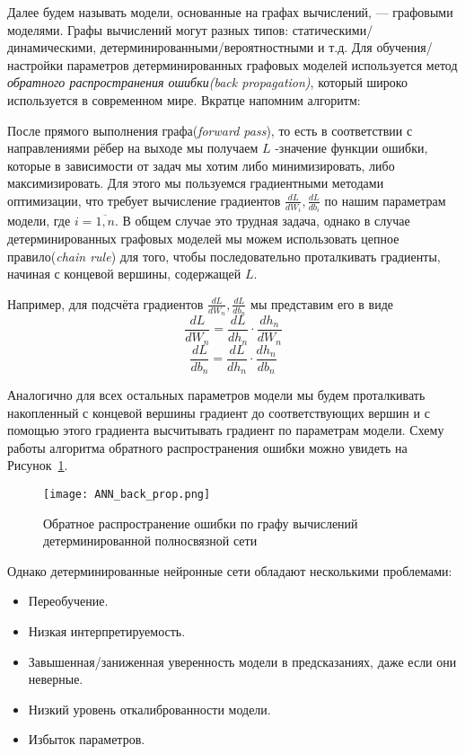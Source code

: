Далее будем называть модели, основанные на графах вычислений, --- графовыми моделями. Графы вычислений могут разных типов:
 статическими/динамическими, детерминированными/вероятностными и т.д. Для обучения/настройки параметров детерминированных графовых моделей
 используется метод \textit{обратного распространения ошибки(back propagation)}, который широко используется в современном мире. Вкратце напомним алгоритм:

После прямого выполнения графа(\textit{forward pass}), то есть в соответствии с направлениями рёбер на выходе мы получаем
 $L$ -значение функции ошибки, которые в зависимости от задач мы хотим либо минимизировать, либо максимизировать. Для этого
 мы пользуемся градиентными методами оптимизации, что требует вычисление градиентов $\frac{dL}{d W_i}, \frac{dL}{d b_i}$ по нашим параметрам модели, где $i = \overline{1,n}$.
 В общем случае это трудная задача, однако в случае детерминированных графовых моделей мы можем использовать цепное правило(\textit{chain rule}) для того, чтобы последовательно
 проталкивать градиенты, начиная с концевой вершины, содержащей $L$.

 Например, для подсчёта градиентов $\frac{dL}{d W_n}, \frac{dL}{d b_n}$ мы представим его в виде
 $$\frac{dL}{d W_n} = \frac{dL}{d h_n} \cdot \frac{d h_n}{d W_n}$$
 $$\frac{dL}{d b_n} = \frac{dL}{d h_n} \cdot \frac{d h_n}{d b_n}$$

Аналогично для всех остальных параметров модели мы будем проталкивать накопленный с концевой вершины градиент до соответствующих вершин и
 с помощью этого градиента высчитывать градиент по параметрам модели. Схему работы алгоритма обратного распространения ошибки
 можно увидеть на Рисунок~\ref{fig:ANN_back_prop}.
\begin{figure}[H]
    \centering
    \texttt{[image: ANN\_back\_prop.png]}
    \caption{Обратное распространение ошибки по графу вычислений детерминированной полносвязной сети}
    \label{fig:ANN_back_prop}
\end{figure}

Однако детерминированные нейронные сети обладают несколькими проблемами:
\begin{itemize}
    \item Переобучение.
    \item Низкая интерпретируемость.
    \item Завышенная/заниженная уверенность модели в предсказаниях, даже если они неверные.
    \item Низкий уровень откалиброванности модели.
    \item Избыток параметров.
\end{itemize}

